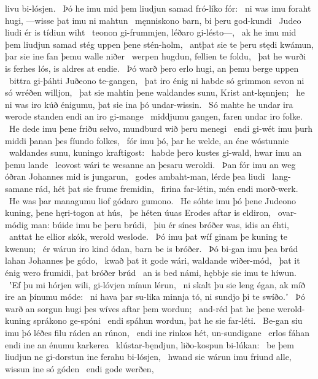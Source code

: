 livu bi-lósjen. \hld\ Þó he imu mid þem liudjun samad
fró-líko fór: \hld\ ni was imu foraht hugi,
—wisse þat imu ni mahtun \hld\ męnniskono barn,
bi þeru god-kundi \hld\ Judeo liudi
ér is tídiun wiht \hld\ teonon gi-frummjen,
léðaro gi-lésto—, \hld\ ak he imu mid þem liudjun samad
stég uppen þene stén-holm, \hld\ antþat sie te þeru stędi kwámun,
þar sie ine fan þemu walle niðer \hld\ werpen hugdun,
fellien te foldu, \hld\ þat he wurði is ferhes lós,
is aldres at endie. \hld\ Þó warð þero erlo hugi,
an þemu berge uppen \hld\ bittra gi-þáhti
Juðeono te-gangen, \hld\ þat iro énig ni habde só grimmon sevon
ni só wréðen willjon, \hld\ þat sie mahtin þene waldandes sunu,
Krist ant-kęnnjen; \hld\ he ni was iro kúð énigumu,
þat sie ina þó undar-wissin. \hld\ Só mahte he undar ira werode standen
endi an iro gi-mange \hld\ middjumu gangen,
faren undar iro folke. \hld\ He dede imu þene friðu selvo,
mundburd wið þeru menegi \hld\ endi gi-wét imu þurh middi þanan
þes fíundo folkes, \hld\ fór imu þó, þar he welde,
an éne wóstunnie \hld\ waldandes sunu,
kuningo kraftigost: \hld\ habde þero kustes gi-wald,
hwar imu an þemu lande \hld\ leovost wári
te wesanne an þesaru weroldi. \hld\ Þan fór imu an weg óðran
Johannes mid is jungarun, \hld\ godes ambaht-man,
lérde þea liudi \hld\ lang-samane rád,
hét þat sie frume fremidin, \hld\ firina far-létin,
mén endi morð-werk. \hld\ He was þar managumu liof
gódaro gumono. \hld\ He sóhte imu þó þene Judeono kuning,
þene hęri-togon at hús, \hld\ þe héten úuas
Erodes aftar is eldiron, \hld\ ovar-módig man:
búide imu be þeru brúdi, \hld\ þiu ér sínes bróðer was,
idis an éhti, \hld\ anttat he ellior skók,
werold weslode. \hld\ Þó imu þat wíf ginam
þe kuning te kwenun; \hld\ ér wárun iro kind ódan,
barn be is bróðer. \hld\ Þó bi-gan imu þea brúd lahan
Johannes þe gódo, \hld\ kwað þat it gode wári,
waldande wiðer-mód, \hld\ þat it énig wero frumidi,
þat bróðer brúd \hld\ an is bed námi,
hębbje sie imu te híwun. \hld\ ʽEf þu mi hórjen wili,
gi-lóvjen mínun lérun, \hld\ ni skalt þu sie leng égan,
ak míð ire an þínumu móde: \hld\ ni hava þar su-lika minnja tó,
ni sundjo þi te swíðo.ʼ \hld\ Þó warð an sorgun hugi
þes wíves aftar þem wordun; \hld\ and-réd þat he þene werold-kuning
sprákono ge-spóni \hld\ endi spáhun wordun,
þat he sie far-léti. \hld\ Be-gan siu imu þó léðes filu
ráden an rúnon, \hld\ endi ine rinkos hét,
un-sundigane \hld\ erlos fáhan
endi ine an énumu karkerea \hld\ klústar-bęndjun,
liðo-kospun bi-lúkan: \hld\ be þem liudjun ne gi-dorstun
ine ferahu bi-lósjen, \hld\ hwand sie wárun imu friund alle,
wissun ine só góden \hld\ endi gode werðen,
